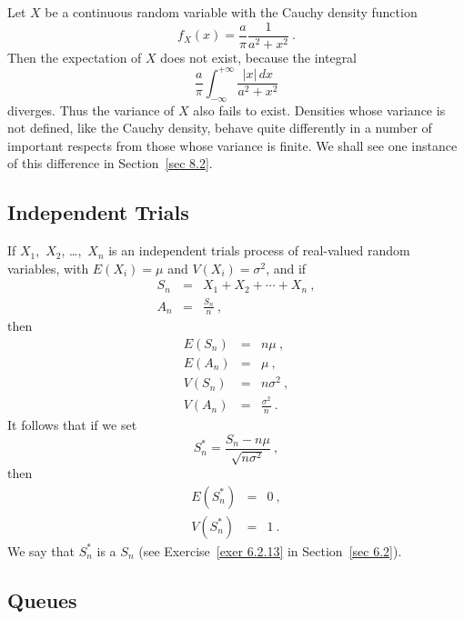 {\begin{example}\label{exam 6.23} Let $X$ be a continuous random variable with the
Cauchy density function
$$ f_X(x) = \frac {a}{\pi} \frac {1}{a^2 + x^2}\ .
$$ Then the expectation of $X$ does not exist, because the integral
$$
\frac a\pi \int_{-\infty}^{+\infty} \frac {|x|\,dx}{a^2 + x^2}
$$ diverges.  Thus the variance of $X$ also fails to exist.  Densities whose variance
is not defined, like the Cauchy density, behave quite differently in a number of
important respects from those whose variance is finite.  We shall see one instance of
this difference in Section~\ref{sec 8.2}.
\end{example}


\subsection*{Independent Trials}

\begin{corollary}\label{cor 6.1}                                               
If $X_1$,~$X_2$, \dots,~$X_n$ is an independent trials
process of real-valued random variables, with $E(X_i) = \mu$ and $V(X_i) = \sigma^2$,
and if
\begin{eqnarray*} S_n & = & X_1 + X_2 +\cdots+ X_n\ , \\ A_n & = & \frac {S_n}n\ ,
\end{eqnarray*} 
then
\begin{eqnarray*}
E(S_n) & = & n\mu\ ,\\
E(A_n) & = & \mu\ ,\\
V(S_n) & = & n\sigma^2\ ,\\
V(A_n) & = & \frac {\sigma^2} n\ .
\end{eqnarray*}
It follows that if we set
$$ 
S_n^* = \frac {S_n - n\mu}{\sqrt{n\sigma^2}}\ ,
$$ 
then
\begin{eqnarray*} 
E(S_n^*) & = & 0\ ,\\
V(S_n^*) & = & 1\ .
\end{eqnarray*}
We say that $S_n^*$ is a   $S_n$ (see
Exercise~\ref{exer 6.2.13} in Section~\ref{sec 6.2}).
\end{corollary}


\subsection*{Queues}

}
